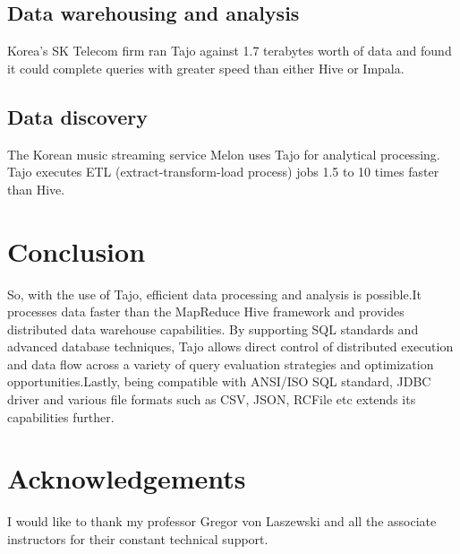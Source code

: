 \documentclass[9pt,twocolumn,twoside]{../../styles/osajnl}
\begin{document}
\subsection{Data warehousing and analysis}
Korea's SK Telecom firm \cite{www-apache-tajo-tutorialspoint} ran Tajo against 1.7 terabytes worth of data and found
it could complete queries with greater speed than either Hive or
Impala.

\subsection{Data discovery}
The Korean music streaming \cite{www-apache-tajo-tutorialspoint}
service Melon uses Tajo for analytical processing. Tajo executes ETL
(extract-transform-load process) jobs 1.5 to 10 times faster than
Hive.

\section{Conclusion}
So, with the use of \cite{www-apache-tajo} Tajo, efficient data
processing and analysis is possible.It processes data faster than the
MapReduce Hive framework and provides distributed data warehouse
capabilities. By supporting SQL standards and advanced database
techniques, Tajo allows direct control of distributed execution and
data flow across a variety of query evaluation strategies and
optimization opportunities.Lastly, being compatible with ANSI/ISO SQL
standard, JDBC driver and various file formats such as CSV, JSON,
RCFile etc extends its capabilities further.

\section*{Acknowledgements}

I would like to thank my professor Gregor von Laszewski and all the
associate instructors for their constant technical support.



 


\newpage

\appendix
\end{document}
